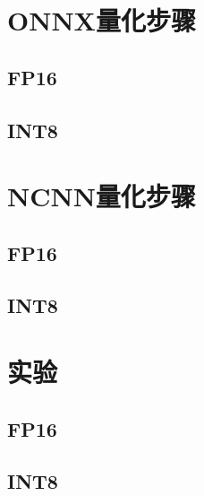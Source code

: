 \section{ONNX量化步骤}

\subsection{FP16}

\subsection{INT8}

\section{NCNN量化步骤}

\subsection{FP16}

\subsection{INT8}

\section{实验}

\subsection{FP16}

\subsection{INT8}
